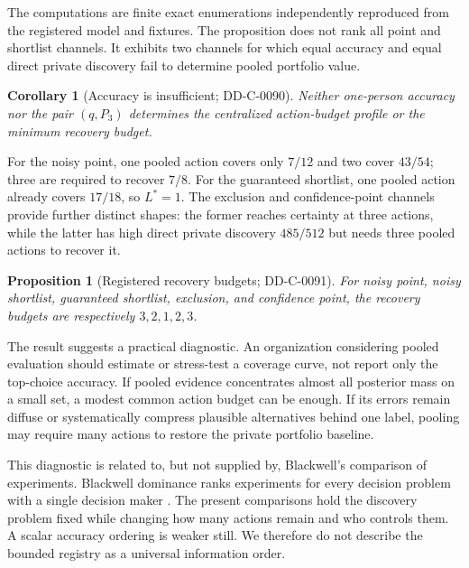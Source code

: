 \documentclass[12pt]{article}
\newtheorem{proposition}[theorem]{Proposition}
\newtheorem{corollary}[theorem]{Corollary}
\theoremstyle{definition}
\begin{document}
The computations are finite exact enumerations independently reproduced from
the registered model and fixtures. The proposition does not rank all point and
shortlist channels. It exhibits two channels for which equal accuracy and equal
direct private discovery fail to determine pooled portfolio value.




\begin{corollary}[Accuracy is insufficient; DD-C-0090]
Neither one-person accuracy nor the pair $(q,P_3)$ determines the centralized
action-budget profile or the minimum recovery budget.
\end{corollary}

For the noisy point, one pooled action covers only $7/12$ and two cover $43/54$;
three are required to recover $7/8$. For the guaranteed shortlist, one pooled
action already covers $17/18$, so $L^*=1$. The exclusion and confidence-point
channels provide further distinct shapes: the former reaches certainty at three
actions, while the latter has high direct private discovery $485/512$ but needs
three pooled actions to recover it.

\begin{proposition}[Registered recovery budgets; DD-C-0091]
For noisy point, noisy shortlist, guaranteed shortlist, exclusion, and confidence
point, the recovery budgets are respectively $3,2,1,2,3$.
\end{proposition}

The result suggests a practical diagnostic. An organization considering pooled
evaluation should estimate or stress-test a coverage curve, not report only the
top-choice accuracy. If pooled evidence concentrates almost all posterior mass
on a small set, a modest common action budget can be enough. If its errors remain
diffuse or systematically compress plausible alternatives behind one label,
pooling may require many actions to restore the private portfolio baseline.

This diagnostic is related to, but not supplied by, Blackwell's comparison of
experiments. Blackwell dominance ranks experiments for every decision problem
with a single decision maker \citep{Blackwell1953}. The present comparisons hold
the discovery problem fixed while changing how many actions remain and who
controls them. A scalar accuracy ordering is weaker still. We therefore do not
describe the bounded registry as a universal information order.
\end{document}
